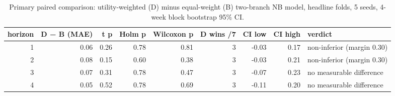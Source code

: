 \begin{table}[t]
\centering
\small
\caption{Primary paired comparison: utility-weighted (D) minus equal-weight (B) two-branch NB model, headline folds, 5 seeds, 4-week block bootstrap 95\% CI.}
\label{tab:primary-D-vs-B}
\begin{tabular}{rrrrrrrrl}
\toprule
horizon & D − B (MAE) & t p & Holm p & Wilcoxon p & D wins /7 & CI low & CI high & verdict \\
\midrule
1 & 0.06 & 0.26 & 0.78 & 0.81 & 3 & -0.03 & 0.17 & non-inferior (margin 0.30) \\
2 & 0.08 & 0.15 & 0.60 & 0.38 & 3 & -0.03 & 0.21 & non-inferior (margin 0.30) \\
3 & 0.07 & 0.31 & 0.78 & 0.47 & 3 & -0.07 & 0.23 & no measurable difference \\
4 & 0.05 & 0.52 & 0.78 & 0.69 & 3 & -0.11 & 0.20 & no measurable difference \\
\bottomrule
\end{tabular}
\end{table}
